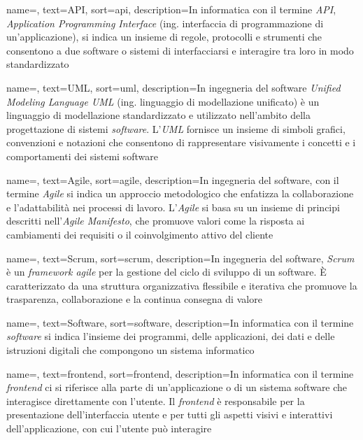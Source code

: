
 {
    name=,
    text=API,
    sort=api,
    description={In informatica con il termine \emph{API}, \emph{Application Programming Interface} (ing. interfaccia di programmazione di un'applicazione), si indica
    un insieme di regole, protocolli e strumenti che consentono a due software o sistemi di interfacciarsi e interagire tra loro in modo standardizzato}
}

 {
    name=,
    text=UML,
    sort=uml,
    description={In ingegneria del software \emph{Unified Modeling Language UML} (ing. linguaggio di modellazione unificato) è un linguaggio di 
    modellazione standardizzato e utilizzato nell'ambito della progettazione di sistemi \emph{software}. L'\emph{UML} fornisce un insieme di simboli grafici, convenzioni e notazioni che consentono di rappresentare
    visivamente i concetti e i comportamenti dei sistemi software}
}

 {
    name=,
    text=Agile,
    sort=agile,
    description={In ingegneria del software, con il termine \emph{Agile} si indica un approccio metodologico che enfatizza la collaborazione e l'adattabilità nei processi di lavoro.
    L'\emph{Agile} si basa su un insieme di principi descritti nell'\emph{Agile Manifesto}, che promuove valori come la risposta ai cambiamenti dei requisiti o il coinvolgimento attivo del cliente}
}

 {
    name=,
    text=Scrum,
    sort=scrum,
    description={In ingegneria del software, \emph{Scrum} è un \emph{framework agile} per la gestione del ciclo di sviluppo di un software. È caratterizzato da una struttura organizzativa flessibile e iterativa che promuove la trasparenza, collaborazione e la continua consegna di valore}
}

 {
    name=,
    text=Software,
    sort=software,
    description={In informatica con il termine \emph{software} si indica l'insieme dei programmi, delle applicazioni, dei dati e delle istruzioni digitali che compongono un sistema informatico}
}

 {
    name=,
    text=frontend,
    sort=frontend,
    description={In informatica con il termine \emph{frontend} ci si riferisce alla parte di un'applicazione o di un sistema software che interagisce direttamente con l'utente. 
    Il \emph{frontend} è responsabile per la presentazione dell'interfaccia utente e per tutti gli aspetti visivi e interattivi dell'applicazione, con cui l'utente può interagire}
}

